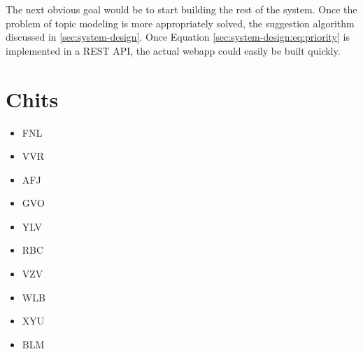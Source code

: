 The next obvious goal would be to start building the rest of the
system.
Once the problem of topic modeling is more appropriately solved, the
suggestion algorithm discussed in \ref{sec:system-design}.
Once Equation \ref{sec:system-design:eq:priority} is implemented in a REST API, the
actual webapp could easily be built quickly.  

\section{Chits}
\begin{itemize}
\item FNL
\item VVR
\item AFJ
\item GVO
\item YLV
\item RBC
\item VZV
\item WLB
\item XYU
\item BLM
\end{itemize}


 